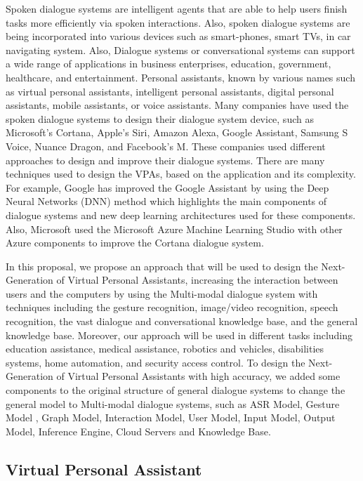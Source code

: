 \documentclass[12pt,a4paper]{article}
\begin{document}
Spoken dialogue systems are intelligent agents that are able
to help users finish tasks more efficiently via spoken
interactions. Also, spoken dialogue systems are being
incorporated into various devices such as smart-phones, smart
TVs, in car navigating system. Also, Dialogue systems or
conversational systems can support a wide range of
applications in business enterprises, education, government,
healthcare, and entertainment. Personal assistants, known by
various names such as virtual personal assistants, intelligent personal assistants, digital personal assistants, mobile
assistants, or voice assistants.
Many companies have used the spoken dialogue systems to
design their dialogue system device, such as Microsoft’s
Cortana, Apple’s Siri, Amazon Alexa, Google Assistant,
Samsung S Voice, Nuance Dragon, and Facebook’s M. These
companies used different approaches to design and improve
their dialogue systems. There are many techniques used to
design the VPAs, based on the application and its complexity.
For example, Google has improved the Google Assistant by
using the Deep Neural Networks (DNN) method which
highlights the main components of dialogue systems and new
deep learning architectures used for these components.
Also, Microsoft used the Microsoft Azure Machine Learning
Studio with other Azure components to improve the Cortana
dialogue system.
\par

\par  
In this proposal, we propose an approach that will be used to
design the Next-Generation of Virtual Personal Assistants,
increasing the interaction between users and the computers by
using the Multi-modal dialogue system with techniques
including the gesture recognition, image/video recognition,
speech recognition, the vast dialogue and conversational
knowledge base, and the general knowledge base. Moreover,
our approach will be used in different tasks including education
assistance, medical assistance, robotics and vehicles,
disabilities systems, home automation, and security access
control. To design the
Next-Generation of Virtual Personal Assistants with high
accuracy, we added some components to the original structure
of general dialogue systems to change the general model to
Multi-modal dialogue systems, such as ASR Model, Gesture
Model , Graph Model, Interaction Model, User Model, Input
Model, Output Model, Inference Engine, Cloud Servers and
Knowledge Base.


\newpage

\begin{center}
\section{Virtual Personal Assistant}
\end{center}
\end{document}
